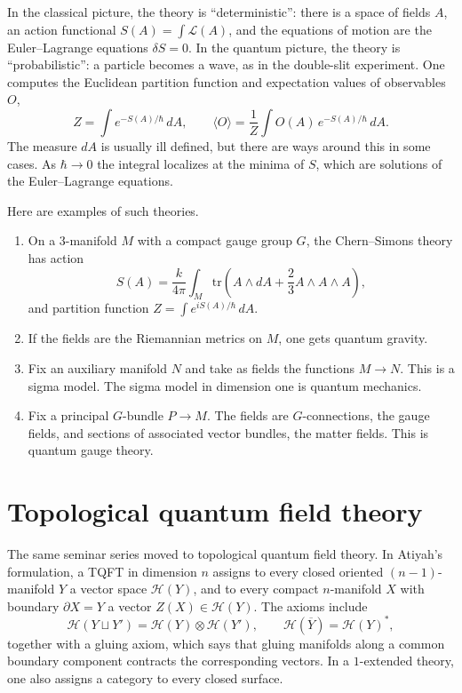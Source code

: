 In the classical picture, the theory is
``deterministic'': there is a space of fields
$A$, an action functional
$S(A)=\int\mathcal{L}(A)$, and the equations
of motion are the Euler--Lagrange equations
$\delta S=0$. In the quantum picture, the
theory is ``probabilistic'': a particle
becomes a wave, as in the double-slit
experiment. One computes the Euclidean
partition function and expectation values of
observables $O$,
$$
Z=\int e^{-S(A)/\hbar}\,dA,\qquad
\langle O\rangle=
\frac{1}{Z}\int O(A)\,e^{-S(A)/\hbar}\,dA.
$$
The measure $dA$ is usually ill defined, but
there are ways around this in some cases. As
$\hbar\to 0$ the integral localizes at the
minima of $S$, which are solutions of the
Euler--Lagrange equations.

Here are examples of such theories.

\begin{enumerate}
\item On a $3$-manifold $M$ with a compact
gauge group $G$, the Chern--Simons theory has
action
$$
S(A)=\frac{k}{4\pi}\int_M
\mathrm{tr}\left(A\wedge dA+
\frac{2}{3}A\wedge A\wedge A\right),
$$
and partition function $Z=\int
e^{iS(A)/\hbar}\,dA$.
\item If the fields are the Riemannian
metrics on $M$, one gets quantum gravity.
\item Fix an auxiliary manifold $N$ and take
as fields the functions $M\to N$. This is a
sigma model. The sigma model in dimension one
is quantum mechanics.
\item Fix a principal $G$-bundle $P\to M$.
The fields are $G$-connections, the gauge
fields, and sections of associated vector
bundles, the matter fields. This is quantum
gauge theory.
\end{enumerate}

\section{Topological quantum field theory}

The same seminar series moved to topological
quantum field theory. In Atiyah's
formulation, a TQFT in dimension $n$ assigns
to every closed oriented $(n-1)$-manifold $Y$
a vector space $\mathcal{H}(Y)$, and to every
compact $n$-manifold $X$ with boundary
$\partial X=Y$ a vector
$Z(X)\in\mathcal{H}(Y)$. The axioms include
$$
\mathcal{H}(Y\sqcup Y')=
\mathcal{H}(Y)\otimes\mathcal{H}(Y'),
\qquad
\mathcal{H}(\overline{Y})=\mathcal{H}(Y)^*,
$$
together with a gluing axiom, which says that
gluing manifolds along a common boundary
component contracts the corresponding
vectors. In a $1$-extended theory, one also
assigns a category to every closed surface.





